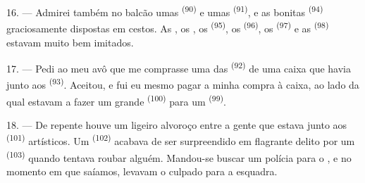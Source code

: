 16. --- Admirei também no balcão umas  \textsuperscript{(90)} e umas
 \textsuperscript{(91)}, e as bonitas  \textsuperscript{(94)} graciosamente dispostas em cestos. As
, os , os 
\textsuperscript{(95)}, os  \textsuperscript{(96)}, os 
\textsuperscript{(97)} e as  \textsuperscript{(98)} estavam muito bem
imitados.

\VUsaut{4.4mm}
\VUsaut{2.8mm}

17. --- Pedi ao meu avô que me comprasse uma das 
\textsuperscript{(92)} de uma caixa que havia junto aos 
\textsuperscript{(93)}. Aceitou, e fui eu mesmo pagar a minha compra à caixa, ao
lado da qual estavam a fazer um grande  \textsuperscript{(100)}
para um  \textsuperscript{(99)}.

18. --- De repente houve um ligeiro alvoroço entre a gente que estava junto
aos  \textsuperscript{(101)} artísticos. Um 
\textsuperscript{(102)} acabava de ser surpreendido em flagrante delito por um
 \textsuperscript{(103)} quando tentava roubar
alguém. Mandou-se buscar um polícia para o , e no momento
em que saíamos, levavam o culpado para a esquadra.
\VUsaut{6.0mm}
\VUfilet{22mm}
